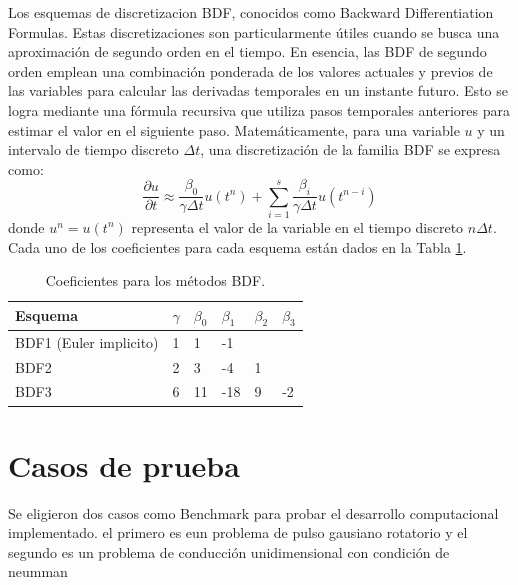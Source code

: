 \documentclass[12pt]{article}
\begin{document}
Los esquemas de discretizacion  BDF, conocidos como Backward Differentiation Formulas. Estas discretizaciones son particularmente útiles cuando se busca una aproximación de segundo orden en el tiempo. En esencia, las BDF de segundo orden emplean una combinación ponderada de los valores actuales y previos de las variables para calcular las derivadas temporales en un instante futuro. Esto se logra mediante una fórmula recursiva que utiliza pasos temporales anteriores para estimar el valor en el siguiente paso. Matemáticamente, para una variable $u$ y un intervalo de tiempo discreto $\Delta t$, una discretización de la familia BDF se expresa como:
\begin{equation}
	\frac{\partial u}{\partial t} \approx \frac{\beta_0}{\gamma \Delta t} u(t^n) + \sum_{i = 1}^{s} \frac{\beta_i}{\gamma \Delta t} u (t^{n-i}) 
\end{equation}
donde $u^n = u(t^n)$ representa el valor de la variable en el tiempo discreto $n\Delta t$.
Cada uno de los coeficientes para cada esquema están dados en la Tabla \ref{tabla2}.

\begin{table}[!h]
	\label{tabla2}
	\caption{Coeficientes para los métodos BDF.}
	\centering
	\begin{tabular}{@{}llllll@{}}
		\toprule
		Esquema                & $\gamma$ & $\beta_0$ & $\beta_1$ & $\beta_2$ & $\beta_3$ \\ \midrule
		BDF1 (Euler implicito) & 1     & 1       & -1      &         &         \\
		BDF2                   & 2     & 3       & -4      & 1       &         \\
		BDF3                   & 6     & 11      & -18     & 9       & -2      \\ \bottomrule
	\end{tabular}
\end{table}
\section{Casos de prueba}
Se eligieron dos casos como Benchmark para probar el desarrollo computacional implementado. el primero es eun problema de pulso gausiano rotatorio y el segundo es un problema de conducción unidimensional con condición de neumman 


\end{document}
